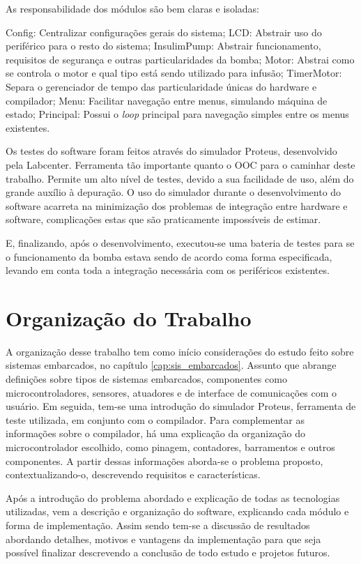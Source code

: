 As responsabilidade dos módulos são bem claras e isoladas:

Config: Centralizar configurações gerais do sistema;
LCD: Abstrair uso do periférico para o resto do sistema;
InsulimPump: Abstrair funcionamento, requisitos de segurança e outras particularidades da bomba;
Motor: Abstrai como se controla o motor e qual tipo está sendo utilizado para infusão;
TimerMotor: Separa o gerenciador de tempo das particularidade únicas do hardware e compilador;
Menu: Facilitar navegação entre menus, simulando máquina de estado;
Principal: Possui o \emph{loop} principal para navegação simples entre os menus existentes.

Os testes do software foram feitos através do simulador Proteus, desenvolvido pela Labcenter. Ferramenta tão importante quanto o OOC para o caminhar deste trabalho. Permite um alto nível de testes, devido a sua facilidade de uso, além do grande auxílio à depuração. O uso do simulador durante o desenvolvimento do software acarreta na minimização dos problemas de integração entre hardware e software, complicações estas que são praticamente impossíveis de estimar. 

E, finalizando, após o desenvolvimento, executou-se uma bateria de testes para se o funcionamento da bomba estava sendo de acordo coma forma especificada, levando em conta toda a integração necessária com os periféricos existentes.

\section{Organização do Trabalho}

A organização desse trabalho tem como início considerações do estudo feito sobre sistemas embarcados, no capítulo \ref{cap:sis_embarcados}. Assunto que abrange definições sobre tipos de sistemas embarcados, componentes como microcontroladores, sensores, atuadores e de interface de comunicações com o usuário. Em seguida, tem-se uma introdução do simulador Proteus, ferramenta de teste utilizada, em conjunto com o compilador. Para complementar as informações sobre o compilador, há uma explicação da organização do microcontrolador escolhido, como pinagem, contadores, barramentos e outros componentes. A partir dessas informações aborda-se o problema proposto, contextualizando-o, descrevendo requisitos e características. 

Após a introdução do problema abordado e explicação de todas as tecnologias utilizadas, vem a descrição e organização do software, explicando cada módulo e forma de implementação. Assim sendo tem-se a discussão de resultados abordando detalhes, motivos e vantagens da implementação para que seja possível finalizar descrevendo a conclusão de todo estudo e projetos futuros.
